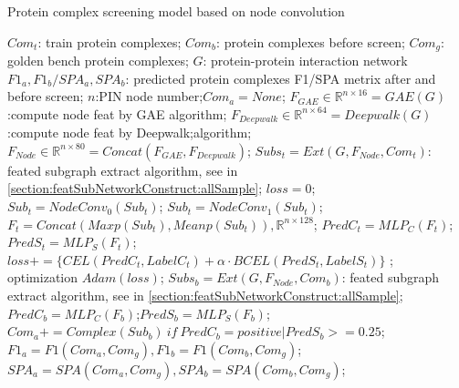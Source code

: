 \begin{algorithm}[h]
    \caption{Protein complex screening model based on node convolution} %
    \label{alg:nodegcn-screen}
    \begin{algorithmic}[1]
        \Require
        $Com_t$: train protein complexes;
        $Com_b$: protein complexes before screen;
        $Com_g$: golden bench protein complexes;
        $G$: protein-protein interaction network
        \Ensure
        $F1_a,F1_b/SPA_a,SPA_b$: predicted protein complexes F1/SPA metrix after and before screen;
        \State $n$:PIN node number;$Com_a=None$;
        \State $F_{GAE} \in \mathbb{R}^{n\times 16}=GAE(G)$:compute node feat by GAE algorithm;
        \State $F_{Deepwalk} \in \mathbb{R}^{n\times 64}=Deepwalk(G)$:compute node feat by Deepwalk;algorithm;
        \State $F_{Node} \in \mathbb{R}^{n\times 80}=Concat(F_{GAE},F_{Deepwalk})$;
        \State $Subs_t=Ext(G,F_{Node},Com_t)$: feated subgraph extract algorithm, see in \ref{section:featSubNetworkConstruct:allSample};
         $loss=0$;
        \State $Sub_t=NodeConv_0(Sub_t)$;
        \State $Sub_t=NodeConv_1(Sub_t)$;
        \State $F_t=Concat(Maxp(Sub_t),Meanp(Sub_t)),\mathbb{R}^{n\times 128}$;
        \State $PredC_t=MLP_C(F_t)$;$PredS_t=MLP_S(F_t)$;
        \State $loss+=\{CEL(PredC_t,LabelC_t)+\alpha \cdot BCEL(PredS_t,LabelS_t)\}$
        \EndFor; optimization $Adam(loss)$;
        \EndFor
        \EndFor
        \State $Subs_b=Ext(G,F_{Node},Com_b)$: feated subgraph extract algorithm, see in \ref{section:featSubNetworkConstruct:allSample};
         $PredC_b=MLP_C(F_b)$;$PredS_b=MLP_S(F_b)$;
        \State $Com_a+=Complex(Sub_b)~if~PredC_b=positive|PredS_b>=0.25$;
        \EndFor
        \State $F1_a=F1(Com_a,Com_g),F1_b=F1(Com_b,Com_g)$;
        \State $SPA_a=SPA(Com_a,Com_g),SPA_b=SPA(Com_b,Com_g)$;
    \end{algorithmic}
\end{algorithm}
